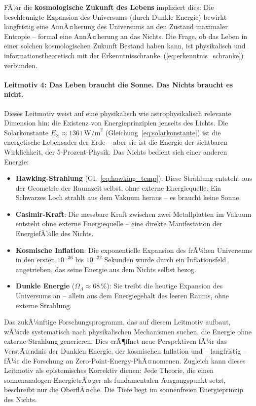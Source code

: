 ﻿\documentclass[12pt,a4paper]{report}
\begin{document}
FÃ¼r die \textbf{kosmologische Zukunft des Lebens} impliziert dies: Die beschleunigte Expansion des Universums (durch Dunkle Energie) bewirkt langfristig eine AnnÃ¤herung des Universums an den Zustand maximaler Entropie -- formal eine AnnÃ¤herung an das Nichts. Die Frage, ob das Leben in einer solchen kosmologischen Zukunft Bestand haben kann, ist physikalisch und informationstheoretisch mit der Erkenntnisschranke~(\ref{eq:erkenntnis_schranke}) verbunden.

\paragraph{Leitmotiv 4: Das Leben braucht die Sonne. Das Nichts braucht es nicht.}

Dieses Leitmotiv weist auf eine physikalisch wie astrophysikalisch relevante Dimension hin: die Existenz von Energieprinzipien jenseits des Lichts. Die Solarkonstante $E_{\odot} \approx 1361\,\text{W/m}^2$ (Gleichung~\ref{eq:solarkonstante}) ist die energetische Lebensader der Erde -- aber sie ist die Energie der sichtbaren Wirklichkeit, der 5-Prozent-Physik. Das Nichts bedient sich einer anderen Energie:

\begin{itemize}
	\item \textbf{Hawking-Strahlung} (Gl.~\ref{eq:hawking_temp}): Diese Strahlung entsteht aus der Geometrie der Raumzeit selbst, ohne externe Energiequelle. Ein Schwarzes Loch strahlt aus dem Vakuum heraus -- es braucht keine Sonne.
	\item \textbf{Casimir-Kraft}: Die messbare Kraft zwischen zwei Metallplatten im Vakuum entsteht ohne externe Energiequelle -- eine direkte Manifestation der EnergiefÃ¼lle des Nichts.
	\item \textbf{Kosmische Inflation}: Die exponentielle Expansion des frÃ¼hen Universums in den ersten $10^{-36}$ bis $10^{-32}$ Sekunden wurde durch ein Inflationsfeld angetrieben, das seine Energie aus dem Nichts selbst bezog.
	\item \textbf{Dunkle Energie} ($\Omega_\Lambda \approx 68\,\%$): Sie treibt die heutige Expansion des Universums an -- allein aus dem Energiegehalt des leeren Raums, ohne externe Strahlung.
\end{itemize}

Das zukÃ¼nftige Forschungsprogramm, das auf diesem Leitmotiv aufbaut, wÃ¼rde systematisch nach physikalischen Mechanismen suchen, die Energie ohne externe Strahlung generieren. Dies erÃ¶ffnet neue Perspektiven fÃ¼r das VerstÃ¤ndnis der Dunklen Energie, der kosmischen Inflation und -- langfristig -- fÃ¼r die Forschung an Zero-Point-Energy-PhÃ¤nomenen. Zugleich kann dieses Leitmotiv als epistemisches Korrektiv dienen: Jede Theorie, die einen sonnenanalogen EnergietrÃ¤ger als fundamentalen Ausgangspunkt setzt, beschreibt nur die OberflÃ¤che. Die Tiefe liegt im sonnenfreien Energieprinzip des Nichts.
\end{document}
